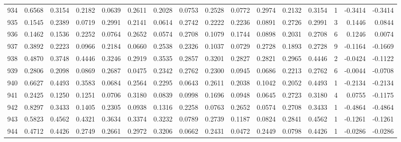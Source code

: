 \begin{tabular}{lrrrrrrrrrrrrrrr}
934 &      0.6568 &  0.3154 &  0.2182 &  0.0639 &  0.2611 &  0.2028 &  0.0753 &  0.2528 &  0.0772 &  0.2974 &   0.2132 &     0.3154 &      1 &                   -0.3414 &                    -0.3414 \\
935 &      0.1545 &  0.2389 &  0.0719 &  0.2991 &  0.2141 &  0.0614 &  0.2742 &  0.2222 &  0.2236 &  0.0891 &   0.2726 &     0.2991 &      3 &                    0.1446 &                     0.0844 \\
936 &      0.1462 &  0.1536 &  0.2252 &  0.0764 &  0.2652 &  0.0574 &  0.2708 &  0.1079 &  0.1744 &  0.0898 &   0.2031 &     0.2708 &      6 &                    0.1246 &                     0.0074 \\
937 &      0.3892 &  0.2223 &  0.0966 &  0.2184 &  0.0660 &  0.2538 &  0.2326 &  0.1037 &  0.0729 &  0.2728 &   0.1893 &     0.2728 &      9 &                   -0.1164 &                    -0.1669 \\
938 &      0.4870 &  0.3748 &  0.4446 &  0.3246 &  0.2919 &  0.3535 &  0.2857 &  0.3201 &  0.2827 &  0.2821 &   0.2965 &     0.4446 &      2 &                   -0.0424 &                    -0.1122 \\
939 &      0.2806 &  0.2098 &  0.0869 &  0.2687 &  0.0475 &  0.2342 &  0.2762 &  0.2300 &  0.0945 &  0.0686 &   0.2213 &     0.2762 &      6 &                   -0.0044 &                    -0.0708 \\
940 &      0.6627 &  0.4493 &  0.3583 &  0.0684 &  0.2564 &  0.2295 &  0.0643 &  0.2611 &  0.2038 &  0.1042 &   0.2052 &     0.4493 &      1 &                   -0.2134 &                    -0.2134 \\
941 &      0.2425 &  0.1250 &  0.1251 &  0.0706 &  0.3180 &  0.0839 &  0.0998 &  0.1696 &  0.0948 &  0.0645 &   0.2723 &     0.3180 &      4 &                    0.0755 &                    -0.1175 \\
942 &      0.8297 &  0.3433 &  0.1405 &  0.2305 &  0.0938 &  0.1316 &  0.2258 &  0.0763 &  0.2652 &  0.0574 &   0.2708 &     0.3433 &      1 &                   -0.4864 &                    -0.4864 \\
943 &      0.5823 &  0.4562 &  0.4321 &  0.3634 &  0.3374 &  0.3232 &  0.0789 &  0.2739 &  0.1187 &  0.0824 &   0.2841 &     0.4562 &      1 &                   -0.1261 &                    -0.1261 \\
944 &      0.4712 &  0.4426 &  0.2749 &  0.2661 &  0.2972 &  0.3206 &  0.0662 &  0.2431 &  0.0472 &  0.2449 &   0.0798 &     0.4426 &      1 &                   -0.0286 &                    -0.0286 \\

\end{tabular}
